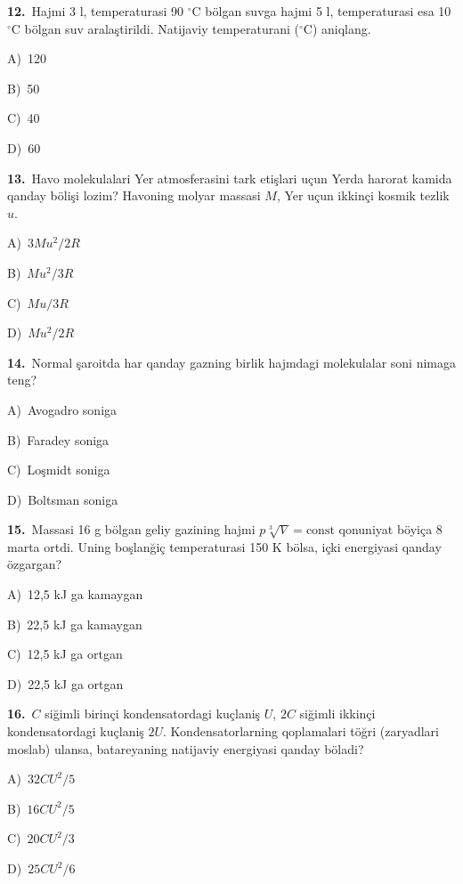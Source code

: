 \documentclass[11pt,a4paper]{article}
\newcommand{\opt}[2]{\hspace*{4mm}#1)\ #2\par}
\begin{document}
\noindent\begin{minipage}{\linewidth}
\textbf{12.}\ Hajmi 3 l, temperaturasi 90 $^\circ$C bölgan suvga hajmi 5 l, temperaturasi esa 10 $^\circ$C bölgan suv aralaştirildi. Natijaviy temperaturani ($^\circ$C) aniqlang.\par\smallskip
\opt{A}{120}
\opt{B}{50}
\opt{C}{40}
\opt{D}{60}
\end{minipage}\vspace{9pt}\par
\noindent\begin{minipage}{\linewidth}
\textbf{13.}\ Havo molekulalari Yer atmosferasini tark etişlari uçun Yerda harorat kamida qanday bölişi lozim? Havoning molyar massasi $M$, Yer uçun ikkinçi kosmik tezlik $u$.\par\smallskip
\opt{A}{$3Mu^2/2R$}
\opt{B}{$Mu^2/3R$}
\opt{C}{$Mu/3R$}
\opt{D}{$Mu^2/2R$}
\end{minipage}\vspace{9pt}\par
\noindent\begin{minipage}{\linewidth}
\textbf{14.}\ Normal şaroitda har qanday gazning birlik hajmdagi molekulalar soni nimaga teng?\par\smallskip
\opt{A}{Avogadro soniga}
\opt{B}{Faradey soniga}
\opt{C}{Loşmidt soniga}
\opt{D}{Boltsman soniga}
\end{minipage}\vspace{9pt}\par
\noindent\begin{minipage}{\linewidth}
\textbf{15.}\ Massasi 16 g bölgan geliy gazining hajmi $p\sqrt[3]{V}=\mathrm{const}$ qonuniyat böyiça 8 marta ortdi. Uning boşlanğiç temperaturasi 150 K bölsa, içki energiyasi qanday özgargan?\par\smallskip
\opt{A}{12,5 kJ ga kamaygan}
\opt{B}{22,5 kJ ga kamaygan}
\opt{C}{12,5 kJ ga ortgan}
\opt{D}{22,5 kJ ga ortgan}
\end{minipage}\vspace{9pt}\par
\noindent\begin{minipage}{\linewidth}
\textbf{16.}\ $C$ siğimli birinçi kondensatordagi kuçlaniş $U$, $2C$ siğimli ikkinçi kondensatordagi kuçlaniş $2U$. Kondensatorlarning qoplamalari töğri (zaryadlari moslab) ulansa, batareyaning natijaviy energiyasi qanday böladi?\par\smallskip
\opt{A}{$32CU^2/5$}
\opt{B}{$16CU^2/5$}
\opt{C}{$20CU^2/3$}
\opt{D}{$25CU^2/6$}
\end{minipage}\vspace{9pt}\par
\end{document}
